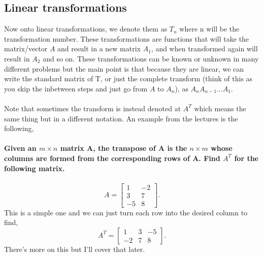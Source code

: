\documentclass{report}
\begin{document}
\begin{multicols}{2}
\section{Linear transformations}%
\label{sec: Linear transformations }
Now onto linear transformations, we denote them as $ T_{ n } $ where n will be the transformation number. These transformations are functions that will take the matrix/vector $ A $ and result in a new matrix $ A_1 $, and when transformed again will result in $ A_2 $ and so on. These transformations can be known or unknown in many different problems but the main point is that because they are linear, we can write the standard matrix of T, or just the complete transform (think of this as you skip the inbetween steps and just go from $ A $ to $ A_{ n } $), as $ A_nA_{ n-1 }\ldots A_1 $. \\\\
Note that sometimes the transform is instead denoted at $ A^{ T } $ which means the same thing but in a different notation. An example from the lectures is the following,\\\\
\textbf{Given an $ m\times n $ matrix A, the transpose of A is the $ n\times m $ whose columns are formed from the corresponding rows of A. Find $ A^{ T } $ for the following matrix.} \\\\
\[
	A=\begin{bmatrix} 1 & -2 \\ 3 & 7 \\ -5 & 8 \end{bmatrix} 
.\] 
This is a simple one and we can just turn each row into the desired column to find,
\[
	A^{ T }= \begin{bmatrix} 1 & 3 & -5 \\ -2 & 7 & 8 \end{bmatrix} 
.\] 
There's more on this but I'll cover that later. 

\end{multicols}
\end{document}
